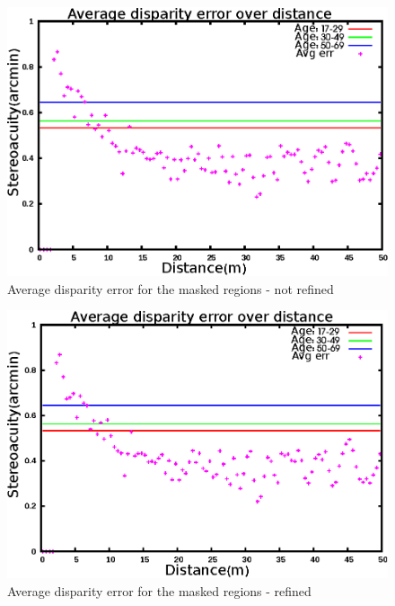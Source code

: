 \begin{figure}[H]
\centering
\includegraphics[scale=0.8]{adcenmsk3NoLR}
\caption{Average disparity error for the masked regions - not refined}
\label{fig:adcmnoLR}
\end{figure} 

\begin{figure}[H]
\centering
\includegraphics[scale=0.8]{adcenmsk3}
\caption{Average disparity error for the masked regions - refined}
\label{fig:adcm3}
\end{figure} 

